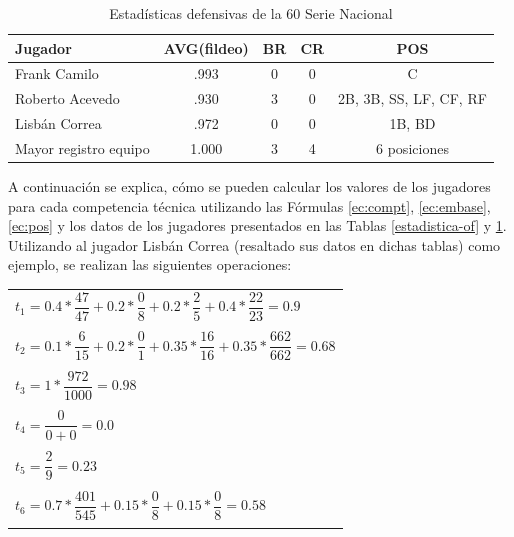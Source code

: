 \begin{table}[H]
		\centering
	\caption{Estadísticas defensivas de la 60 Serie Nacional}\label{estadistica-def}
		\begin{tabular}{l c c c c}
			\toprule[1.7pt]
			Jugador      &     AVG(fildeo) & BR & CR & POS                    \\ \midrule
			Frank Camilo  &   .993        & 0  & 0  & C                      \\
			Roberto Acevedo&  .930        & 3  & 0  & 2B, 3B, SS, LF, CF, RF \\
			\rowcolor{gray!30} Lisbán Correa   & .972        & 0  & 0  & 1B, BD \\ \midrule
			
			\multicolumn{1}{p{4cm}}{Mayor registro equipo}& 1.000 & 3&4 & 6 posiciones\\ 
			\bottomrule[1pt]
		\end{tabular}
	
\end{table}

A continuación se explica, cómo se pueden calcular los valores de los jugadores para cada competencia técnica utilizando las Fórmulas \ref{ec:compt}, \ref{ec:embase}, \ref{ec:pos} y los datos de los jugadores presentados en las Tablas \ref{estadistica-of} y \ref{estadistica-def}. Utilizando al jugador Lisbán Correa (resaltado sus datos en dichas tablas) como ejemplo, se realizan las siguientes operaciones:

\begin{tabular}{l}
	\\
	$t_1 = 0.4 * \dfrac{47}{47} + 0.2 * \dfrac{0}{8} + 0.2 * \dfrac{2}{5} + 0.4 * \dfrac{22}{23} = 0.9$ \\ 
	\\
	$t_2 = 0.1 * \dfrac{6}{15} + 0.2 * \dfrac{0}{1} + 0.35 * \dfrac{16}{16} + 0.35 * \dfrac{662}{662} = 0.68$ \\
	\\
	$t_3 = 1 * \dfrac{972}{1000} = 0.98$ \\
	\\
	$t_4 = \dfrac{0}{0+0} = 0.0$ \\
	\\
	$t_5 = \dfrac{2}{9} = 0.23$ \\
	\\
	$t_6 = 0.7 * \dfrac{401}{545} + 0.15 * \dfrac{0}{8} + 0.15 * \dfrac{0}{8} = 0.58$\\\\
\end{tabular}

